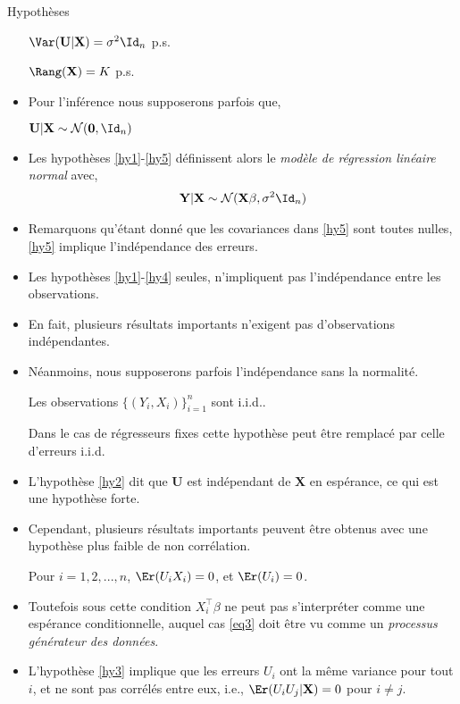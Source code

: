\begin{frame}[allowframebreaks]{Hypothèses}
\begin{itemize}
\begin{hypothese}
$\Var(\mathbf{U}|\mathbf{X}) = \sigma^2\Id_n$ p.s.
\label{hy3}
\end{hypothese}
\begin{hypothese}
$\Rang(\mathbf{X}) = K$ p.s.
\label{hy4}
\end{hypothese}
\item Pour l'inférence nous supposerons parfois que,
\begin{hypothese}
$\mathbf{U} | \mathbf{X} \sim \mathcal{N}(\mathbf{0}, \Id_n)$
\label{hy5}
\end{hypothese}
\item Les hypothèses \ref{hy1}-\ref{hy5} définissent alors le \emph{modèle de régression linéaire normal} avec,
\begin{align*}
\mathbf{Y}|\mathbf{X} \sim\mathcal{N}(\mathbf{X}\beta, \sigma^2\Id_n)
\end{align*}
\item Remarquons qu'étant donné que les covariances dans \ref{hy5} sont toutes nulles,  \ref{hy5} implique l'indépendance des erreurs. 
\item Les hypothèses \ref{hy1}-\ref{hy4} seules, n'impliquent pas l'indépendance entre les observations. 
\item En fait, plusieurs résultats importants n'exigent pas d'observations indépendantes. 
\item Néanmoins, nous supposerons parfois l'indépendance  sans la normalité.
\begin{hypothese}
Les observations $\{(Y_i, X_i)\}_{i=1}^n$ sont i.i.d..
\label{hy6}
\end{hypothese}
Dans le cas de régresseurs fixes cette hypothèse peut être remplacé par celle d'erreurs i.i.d.
\item L'hypothèse \ref{hy2} dit que $\mathbf{U}$ est indépendant de $\mathbf{X}$ en espérance, ce qui est une hypothèse forte. 
\item Cependant, plusieurs résultats importants peuvent être obtenus avec une hypothèse plus faible  de non corrélation.
\begin{hypothese}
Pour $i=1,2,...,n$, $\Er(U_iX_i)=0$, et $\Er(U_i)=0$.
\label{hy7}
\end{hypothese}
\item Toutefois sous cette condition $X_i^\top\beta$ ne peut pas s'interpréter comme une espérance conditionnelle, auquel cas \eqref{eq3} doit être vu comme un \emph{processus générateur des données}.
\item L'hypothèse \ref{hy3} implique que les erreurs $U_i$ ont la même variance pour tout $i$, et ne sont pas corrélés entre eux, i.e., $\Er(U_iU_j| \mathbf{X}) = 0$ pour $i\neq j$. 

\end{itemize}
\end{frame}
